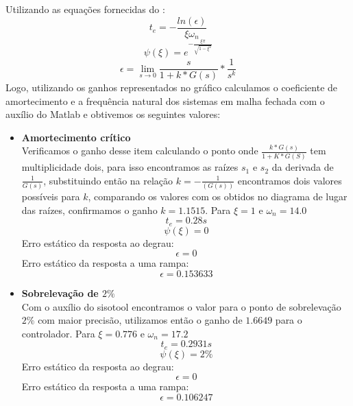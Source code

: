 \documentclass{article}
\begin{document}
 Utilizando as equações fornecidas do \cite{bb:roteiro}:
	\begin{equation}
	\label{eq:establizacao}
	t_{e} = - \frac{ln(\epsilon)}{\xi \omega_n}
	\end{equation}
	\begin{equation}
	\label{eq:overshoot}
	\psi(\xi) = e^{-\frac{\xi\pi}{\sqrt{1-\xi^2}}}
	\end{equation}
	\begin{equation}
	\label{eq:err}
	\epsilon = \lim_{s\to 0} \frac{s}{1 + k*G(s)}*\frac{1}{s^k}
	\end{equation}
 Logo, utilizando os ganhos representados no gráfico calculamos o coeficiente de amortecimento e a frequência natural dos sistemas em malha fechada com o auxílio do Matlab e obtivemos os seguintes valores:
 \begin{itemize}
 	\item{\textbf{Amortecimento crítico}}\\
 	Verificamos o ganho desse item calculando o ponto onde $\frac{k*G(s)}{1 + K*G(S)}$ tem multiplicidade dois, para isso encontramos as raízes $s_1$ e $s_2$ da derivada de $\frac{1}{G(s)}$, substituindo então na relação $k = -\frac{1}{(G(s))}$ encontramos dois valores possíveis para $k$, comparando os valores com os obtidos no diagrama de lugar das raízes, confirmamos o ganho $k = 1.1515$.
	 	Para $\xi = 1$ e $\omega_n = 14.0$ 
	 	 \begin{equation}
	 	 \label{eq:tec}
	 	 t_{e} = 0.28 s
	 	 \end{equation}
	 	 \begin{equation}
	 	 \label{eq:ovc}
	 	 \psi(\xi) = 0
	 	 \end{equation}
	 	 Erro estático da resposta ao degrau:
 	 	 \begin{equation}
 	 	 \label{eq:errcsp}
 	 	 \epsilon = 0
 	 	 \end{equation}
 	 	 Erro estático da resposta a uma rampa:
  	 	 \begin{equation}
  	 	 \label{eq:errcrp}
  	 	 \epsilon = 0.153633
  	 	 \end{equation}
  	\item{\textbf{Sobrelevação de $2\%$}}\\
	  	Com o auxílio do sisotool encontramos o valor para o ponto de sobrelevação $2\%$ com maior precisão, utilizamos então o ganho de $1.6649$ para o controlador.
	  	Para $\xi = 0.776$ e $\omega_n = 17.2$ 
	  	 \begin{equation}
	  	 \label{eq:teo}
	  	 t_{e} = 0.2931 s
	  	 \end{equation}
	 	 \begin{equation}
	 	 \label{eq:ovo}
	 	 \psi(\xi) = 2\%
	 	 \end{equation}
	 	 Erro estático da resposta ao degrau:
	 	 \begin{equation}
	 	 \label{eq:errosp}
	 	 \epsilon = 0
	 	 \end{equation}
	 	 Erro estático da resposta a uma rampa:
	 	 \begin{equation}
	 	 \label{eq:errorp}
	 	 \epsilon = 0.106247
	 	 \end{equation}
 \end{itemize}
\end{document}
